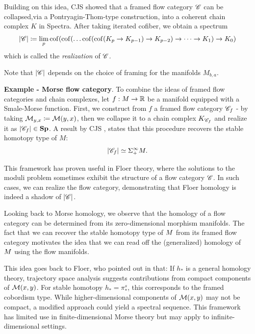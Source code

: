 Building on this idea, CJS showed that a framed flow category $\mathscr{C}$ can be collapsed,via a Pontryagin-Thom-type construction, into a coherent chain complex $K$ in Spectra. After taking iterated cofiber, we obtain a spectrum
\[
    \left\lvert\mathscr{C}\right\rvert \coloneq \lim_p \operatorname{cof} (\operatorname{cof} (\dots \operatorname{cof} (\operatorname{cof} (K_p \to K_{p-1}) \to K_{p-2}) \to \dots \to K_1) \to  K_0)
\]
which is called the \emph{realization} of $\mathscr{C}$.
\begin{rem*}
    Note that $\left\lvert\mathscr{C}\right\rvert$ depends on the choice of framing for the manifolds $M_{b,a}$.
\end{rem*}

\textbf{Example - Morse flow category}. To combine the ideas of framed flow categories and chain complexes, let $f: M \to \mathbb{R}$ be a manifold equipped with a Smale-Morse function. First, we construct from $f$ a framed flow category $\mathscr{C}_f$ - by taking $\mathcal{M}_{y,x} \coloneq \mathcal{M}(y,x)$, then we collapse it to a chain complex $K_{\mathscr{C}_f}$ and realize it as $\left\lvert\mathscr{C}_f\right\rvert \in \mathbf{Sp}$. A result by CJS \cite{CJS95}, states that this procedure recovers the stable homotopy type of $M$:
\begin{equation*}
    \left\lvert\mathscr{C}_f\right\rvert \simeq \Sigma^{\infty}_+ M.
\end{equation*}

This framework has proven useful in Floer theory, where the solutions to the moduli problem sometimes exhibit the structure of a flow category $\mathscr{C}$. In such cases, we can realize the flow category, demonstrating that Floer homology is indeed a shadow of $\left\lvert\mathscr{C}\right\rvert$.

Looking back to Morse homology, we observe that the homology of a flow category can be determined from its zero-dimensional morphism manifolds. The fact that we can recover the stable homotopy type of $M$ from its framed flow category motivates the idea that we can read off the (generalized) homology of $M$ using the flow manifolds.

This idea goes back to Floer, who pointed out in \cite{floer1989witten} that: If $h_*$ is a general homology theory, trajectory space analysis suggests contributions from compact components of $\mathcal{M}(x, y)$. For stable homotopy $h_* = \pi^{s}_*$, this corresponds to the framed cobordism type. While higher-dimensional components of $\mathcal{M}(x, y)$ may not be compact, a modified approach could yield a spectral sequence. This framework has limited use in finite-dimensional Morse theory but may apply to infinite-dimensional settings. 


